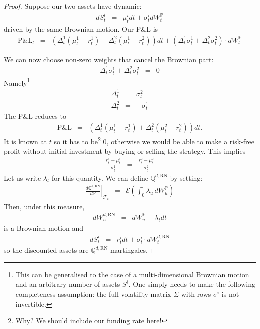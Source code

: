 \documentclass[11pt,english]{amsart}
\newcommand{\RN}{\mathrm{RN}}
\newcommand{\PnL}{\mathrm{P\&L}}
\newcommand{\PP}{\mathbb{P}}
\newcommand{\QQ}{\mathbb{Q}}
\theoremstyle{definition}
\begin{document}
\begin{proof}
Suppose our two assets have dynamic:
\begin{eqnarray*}
	dS^i_t &=& \mu^i_t dt + \sigma^i_t  dW^\PP_t   
\end{eqnarray*} 
driven by the same Brownian motion. Our P\&L is
\begin{eqnarray*}
	\PnL_{t} 
	&=& \left( \Delta^1_t (\mu^1_t-r^1_t) + \Delta^2_t (\mu^1_t-r^2_t) \right)dt 
	+  \left( \Delta^1_t \sigma^1_t + \Delta^2_t \sigma^2_t \right) \cdot dW^\PP_t
\end{eqnarray*} 

We can now choose non-zero weights that cancel the Brownian part: 
\begin{eqnarray*}
	\Delta^1_t \sigma^1_t + \Delta^2_t \sigma^2_t &=& 0
\end{eqnarray*} 
Namely\footnote{This can be generalised to the case of a multi-dimensional Brownian motion and an arbitrary number of assets $S^i$. One simply needs to make the following completeness assumption: the full volatility matrix $\Sigma$ with rows $\sigma^i$ is not invertible.}
\begin{eqnarray*}
	\Delta^1_t &=&  \sigma^2_t \\
	\Delta^2_t &=& -\sigma^1_t 
\end{eqnarray*} 
The P\&L reduces to
\begin{eqnarray*}
	\PnL &=& \left( \Delta^1_t (\mu^1_t-r^1_t) + \Delta^2_t (\mu^2_t-r^2_t) \right)dt .
\end{eqnarray*} 
It is known at $t$ so it has to be\footnote{Why? We should include our funding rate here!} $0$, otherwise we would be able to make a risk-free profit without initial investment by buying or selling the strategy. This implies 
\begin{eqnarray*}
	\frac{r^1_t - \mu^1_t}{\sigma^1_t} &=& \frac{r^2_t - \mu^2_t}{\sigma^2_t}
\end{eqnarray*} 
Let us write $\lambda_t$ for this quantity. We can define $\QQ^{d,\RN}$ by setting:
\begin{eqnarray*}
	\left. \frac{d\QQ^{d,\RN}}{d\PP} \right|_{\mathcal{F}_t} 
	&=& \mathcal{E}\left(\int_0^\cdot \lambda_u\,dW^\PP_u\right) 
\end{eqnarray*} 
Then, under this measure, 
\begin{eqnarray*}
	dW^{d,\RN}_u &=& dW^\PP_u - \lambda_t dt 
\end{eqnarray*} 
is a Brownian motion and 
\begin{eqnarray*}
	dS^i_t &=& r^i_t dt + \sigma^i_t \cdot dW^{d,\RN}_t   
\end{eqnarray*} 
so the discounted assets are $\QQ^{d,\RN}$-martingales.
\end{proof}
\end{document}
